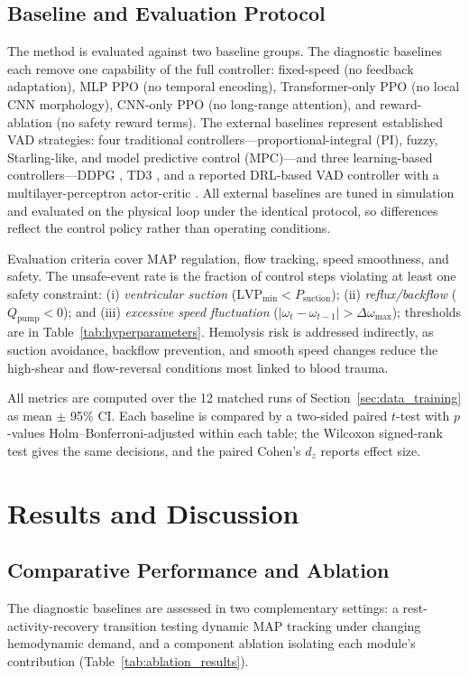 \documentclass[sigconf]{acmart}
\begin{document}
\subsection{Baseline and Evaluation Protocol}
The method is evaluated against two baseline groups. The diagnostic baselines each remove one capability of the full controller: fixed-speed (no feedback adaptation), MLP PPO (no temporal encoding), Transformer-only PPO (no local CNN morphology), CNN-only PPO (no long-range attention), and reward-ablation (no safety reward terms). The external baselines represent established VAD strategies: four traditional controllers---proportional-integral (PI), fuzzy, Starling-like, and model predictive control (MPC)---and three learning-based controllers---DDPG \cite{b18}, TD3 \cite{b19}, and a reported DRL-based VAD controller with a multilayer-perceptron actor-critic \cite{b10,b11,b12}. All external baselines are tuned in simulation and evaluated on the physical loop under the identical protocol, so differences reflect the control policy rather than operating conditions.

Evaluation criteria cover MAP regulation, flow tracking, speed smoothness, and safety. The unsafe-event rate is the fraction of control steps violating at least one safety constraint: (i) \emph{ventricular suction} ($\mathrm{LVP}_{\min}<P_{\mathrm{suction}}$); (ii) \emph{reflux/backflow} ($Q_{\mathrm{pump}}<0$); and (iii) \emph{excessive speed fluctuation} ($|\omega_t-\omega_{t-1}|>\Delta\omega_{\max}$); thresholds are in Table~\ref{tab:hyperparameters}. Hemolysis risk is addressed indirectly, as suction avoidance, backflow prevention, and smooth speed changes reduce the high-shear and flow-reversal conditions most linked to blood trauma.

All metrics are computed over the 12 matched runs of Section~\ref{sec:data_training} as mean $\pm$ 95\% CI. Each baseline is compared by a two-sided paired $t$-test with $p$-values Holm--Bonferroni-adjusted within each table; the Wilcoxon signed-rank test gives the same decisions, and the paired Cohen's $d_z$ reports effect size.

\section{Results and Discussion}

\subsection{Comparative Performance and Ablation}
The diagnostic baselines are assessed in two complementary settings: a rest-activity-recovery transition testing dynamic MAP tracking under changing hemodynamic demand, and a component ablation isolating each module's contribution (Table~\ref{tab:ablation_results}).
\end{document}
